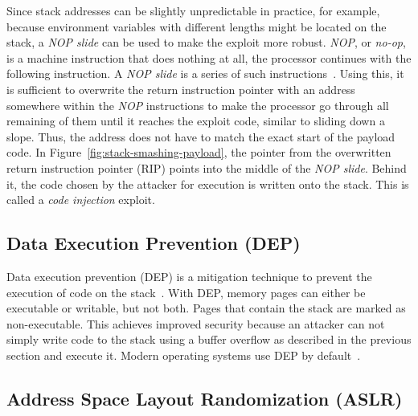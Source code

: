 

Since stack addresses can be slightly unpredictable in practice, for example, because environment variables with
different lengths might be located on the stack, a \textit{NOP slide} can be used to make the exploit more robust.
\textit{NOP}, or \textit{no-op}, is a machine instruction that does nothing at all, the processor continues with the
following instruction.
A \textit{NOP slide} is a series of such instructions~\cite{vallentin2007}.
Using this, it is sufficient to overwrite the return instruction pointer with an address somewhere within the
\textit{NOP} instructions to make the processor go through all remaining of them until it reaches the exploit code,
similar to sliding down a slope.
Thus, the address does not have to match the exact start of the payload code.
In Figure~\ref{fig:stack-smashing-payload}, the pointer from the overwritten return instruction pointer (\acrshort{RIP})
points into the middle of the \textit{NOP slide}.
Behind it, the code chosen by the attacker for execution is written onto the stack.
This is called a \textit{code injection} exploit.



\subsection{Data Execution Prevention (DEP)}\label{subsec:background:exploit-techniques:dep}

Data execution prevention (\acrshort{DEP}) is a mitigation technique to prevent the execution of code on the
stack~\cite{gao2013}.
With \acrshort{DEP}, memory pages can either be executable or writable, but not both.
Pages that contain the stack are marked as non-executable.
This achieves improved security because an attacker can not simply write code to the stack using a buffer overflow as
described in the previous section and execute it.
Modern operating systems use \acrshort{DEP} by default~\cite{davi2011}.



\subsection{Address Space Layout Randomization (ASLR)}\label{subsec:background:exploit-techniques:aslr}

